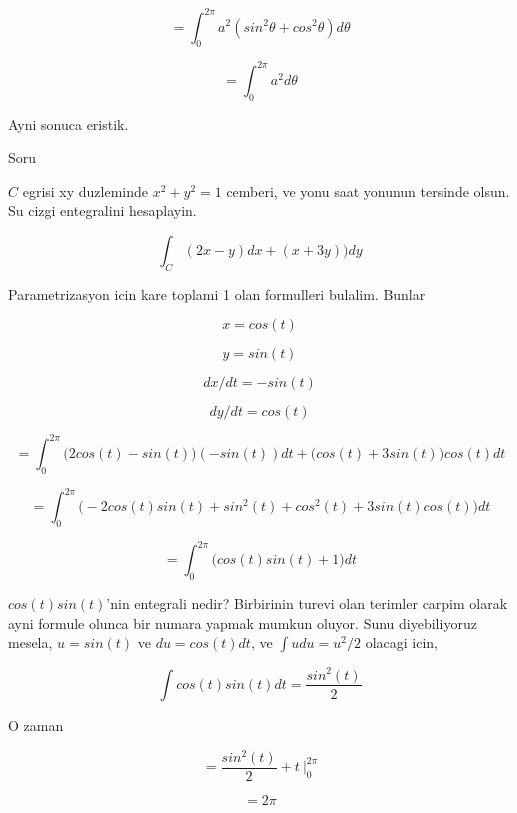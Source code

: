 \documentclass[12pt,fleqn]{article}
\begin{document}
\[ = \int_0^{2\pi} a^2 (sin^2\theta + cos^2\theta)d\theta \]

\[ = \int_0^{2\pi} a^2 d\theta \]

Ayni sonuca eristik. 

Soru 

$C$ egrisi xy duzleminde $x^2+y^2=1$ cemberi, ve yonu saat yonunun tersinde
olsun. Su cizgi entegralini hesaplayin.

\[ \int_C (2x-y)dx + (x+3y))dy \]

Parametrizasyon icin kare toplami 1 olan formulleri bulalim. Bunlar

\[ x = cos(t) \]

\[ y = sin(t) \]

\[ dx/dt = -sin(t)\]

\[ dy/dt = cos(t) \]

\[ =
\int_0^{2\pi} \bigg( 2cos(t) - sin(t) \bigg)(-sin(t))dt + 
\bigg(cos(t) + 3sin(t)\bigg)cos(t) dt
 \]

\[ = 
\int_0^{2\pi} \bigg( 
-2cos(t)sin(t) + sin^2(t) + 
cos^2(t) + 3sin(t)cos(t)
\bigg) dt
 \]

\[ = 
\int_0^{2\pi} \bigg( 
cos(t)sin(t) + 1
\bigg) dt
 \]

$cos(t)sin(t)$'nin entegrali nedir? Birbirinin turevi olan terimler carpim
olarak ayni formule olunca bir numara yapmak mumkun oluyor. Sunu 
diyebiliyoruz mesela, $u=sin(t)$ ve $du=cos(t)dt$, ve $\int u du = u^2/2$
olacagi icin, 

\[ \int cos(t)sin(t)dt = \frac{sin^2(t)}{2} \]

O zaman 

\[ = \frac{sin^2(t)}{2} + t \ \bigg|_0^{2\pi}  \]

\[ =  2\pi \]
\end{document}
